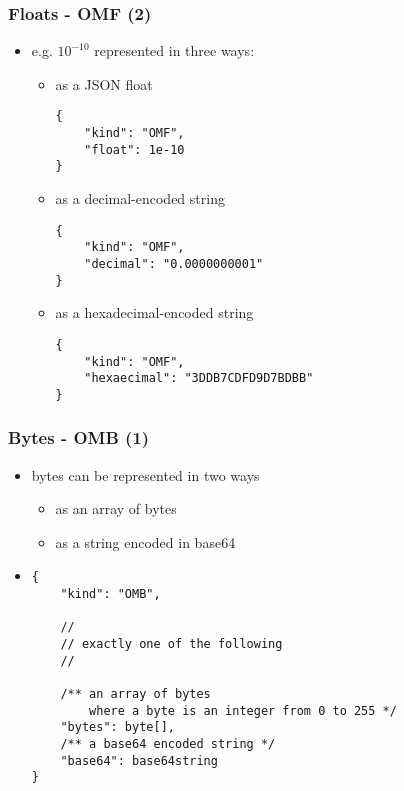 \documentclass[usenames,dvipsnames]{beamer}
\begin{document}
\begin{frame}[fragile]
    \frametitle{Floats - OMF (2)}
    \begin{itemize}
    \item e.g. $10^{-10}$ represented in three ways:
    \begin{itemize}
        \item as a JSON float
\begin{lstlisting}
{
    "kind": "OMF",
    "float": 1e-10
}
\end{lstlisting}
        \item as a decimal-encoded string
\begin{lstlisting}
{
    "kind": "OMF",
    "decimal": "0.0000000001"
}
\end{lstlisting}
        \item as a hexadecimal-encoded string
\begin{lstlisting}
{
    "kind": "OMF",
    "hexaecimal": "3DDB7CDFD9D7BDBB"
}
\end{lstlisting}
        \end{itemize}
    \end{itemize}
\end{frame}

\begin{frame}[fragile]
    \frametitle{Bytes - OMB (1)}
    \begin{itemize}
        \item bytes can be represented in two ways
        \begin{itemize}
            \item as an array of bytes
            \item as a string encoded in base64
        \end{itemize}
        \item
\begin{lstlisting}
{
    "kind": "OMB",

    //
    // exactly one of the following
    //

    /** an array of bytes
        where a byte is an integer from 0 to 255 */
    "bytes": byte[],
    /** a base64 encoded string */
    "base64": base64string
}
\end{lstlisting}
    \end{itemize}
\end{frame}
\end{document}
